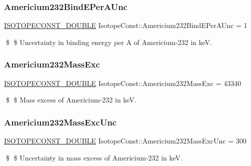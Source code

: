 \subsubsection{\texorpdfstring{Americium232\+Bind\+E\+Per\+A\+Unc}{Americium232BindEPerAUnc}}
{\footnotesize\ttfamily \mbox{\hyperlink{group___isotope_const-_macros_ga8f45a7272ce02c0b4c65c44636ed719a}{I\+S\+O\+T\+O\+P\+E\+C\+O\+N\+S\+T\+\_\+\+D\+O\+U\+B\+LE}} Isotope\+Const\+::\+Americium232\+Bind\+E\+Per\+A\+Unc = 1}

\$ \$ Uncertainty in binding energy per A of Americium-\/232 in keV. \mbox{\label{group___isotope_const-_americium-_am232_ga2767e53c347eba748ebab382ad6fd44a}} 
\subsubsection{\texorpdfstring{Americium232\+Mass\+Exc}{Americium232MassExc}}
{\footnotesize\ttfamily \mbox{\hyperlink{group___isotope_const-_macros_ga8f45a7272ce02c0b4c65c44636ed719a}{I\+S\+O\+T\+O\+P\+E\+C\+O\+N\+S\+T\+\_\+\+D\+O\+U\+B\+LE}} Isotope\+Const\+::\+Americium232\+Mass\+Exc = 43340}

\$ \$ Mass excess of Americium-\/232 in keV. \mbox{\label{group___isotope_const-_americium-_am232_ga4312dc62ecf3fe0fe38169406e9f5c02}} 
\subsubsection{\texorpdfstring{Americium232\+Mass\+Exc\+Unc}{Americium232MassExcUnc}}
{\footnotesize\ttfamily \mbox{\hyperlink{group___isotope_const-_macros_ga8f45a7272ce02c0b4c65c44636ed719a}{I\+S\+O\+T\+O\+P\+E\+C\+O\+N\+S\+T\+\_\+\+D\+O\+U\+B\+LE}} Isotope\+Const\+::\+Americium232\+Mass\+Exc\+Unc = 300}

\$ \$ Uncertainty in mass excess of Americium-\/232 in keV. \mbox{\label{group___isotope_const-_americium-_am232_gab68c0751c635ece77c61ba7cecbf0d46}} 
